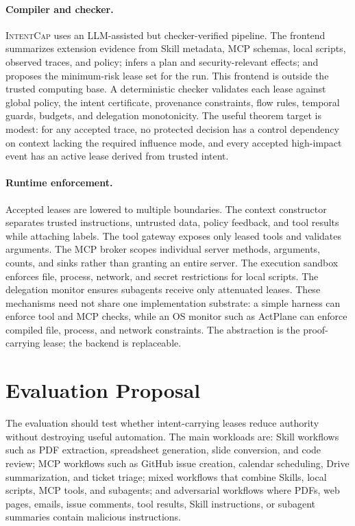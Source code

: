 \documentclass[sigconf,nonacm]{acmart}
\newcommand{\sys}{\textsc{IntentCap}\xspace}
\begin{document}
\paragraph{Compiler and checker.}
\sys uses an LLM-assisted but checker-verified pipeline. The frontend summarizes extension evidence from Skill metadata, MCP schemas, local scripts, observed traces, and policy; infers a plan and security-relevant effects; and proposes the minimum-risk lease set for the run. This frontend is outside the trusted computing base. A deterministic checker validates each lease against global policy, the intent certificate, provenance constraints, flow rules, temporal guards, budgets, and delegation monotonicity. The useful theorem target is modest: for any accepted trace, no protected decision has a control dependency on context lacking the required influence mode, and every accepted high-impact event has an active lease derived from trusted intent.

\paragraph{Runtime enforcement.}
Accepted leases are lowered to multiple boundaries. The context constructor separates trusted instructions, untrusted data, policy feedback, and tool results while attaching labels. The tool gateway exposes only leased tools and validates arguments. The MCP broker scopes individual server methods, arguments, counts, and sinks rather than granting an entire server. The execution sandbox enforces file, process, network, and secret restrictions for local scripts. The delegation monitor ensures subagents receive only attenuated leases. These mechanisms need not share one implementation substrate: a simple harness can enforce tool and MCP checks, while an OS monitor such as ActPlane can enforce compiled file, process, and network constraints. The abstraction is the proof-carrying lease; the backend is replaceable.

\section{Evaluation Proposal}

The evaluation should test whether intent-carrying leases reduce authority without destroying useful automation. The main workloads are: Skill workflows such as PDF extraction, spreadsheet generation, slide conversion, and code review; MCP workflows such as GitHub issue creation, calendar scheduling, Drive summarization, and ticket triage; mixed workflows that combine Skills, local scripts, MCP tools, and subagents; and adversarial workflows where PDFs, web pages, emails, issue comments, tool results, Skill instructions, or subagent summaries contain malicious instructions.
\end{document}
